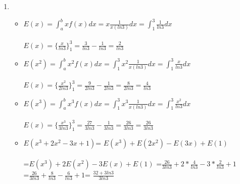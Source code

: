 \documentclass[a4paper,11pt]{article}
\begin{document}
\begin{enumerate}
\item \begin{itemize}
    \item $E(x) = \int_a^bxf(x)dx = x\frac{1}{x(ln3)} dx= \int_1^3\frac{1}{ln3}dx$\\\\
    $E(x) =\{\frac{x}{ln3}\}_1^3 = \frac{3}{ln3}-\frac{1}{ln3} = \frac{2} {ln3}$
    \vspace{0.7cm}
    \item $E(x^2) = \int_a^bx^2f(x)dx =\int_1^3 x^2\frac{1}{x(ln3)} dx= \int_1^3\frac{x}{ln3}dx$\\\\
      $E(x) =\{\frac{x^2}{2ln3}\}_1^3 = \frac{9}{2ln3}-\frac{1}{2ln3} = \frac{8} {2ln3} =\frac{4} {ln3} $
      \vspace{0.7cm}
    \item $E(x^3) = \int_a^bx^3f(x)dx =\int_1^3 x^3\frac{1}{x(ln3)} dx= \int_1^3\frac{x^2}{ln3}dx$\\\\
      $E(x) =\{\frac{x^3}{3ln3}\}_1^3 = \frac{27}{3ln3}-\frac{1}{3ln3} = \frac{26} {3ln3} =\frac{26}{3ln3}$
      \vspace{0.7cm}
      \item $E(x^3+2x^2-3x+1)$= $E(x^3)+E(2x^2)-E(3x)+E(1)$ \\\\
      =$E(x^3)+2E(x^2)-3E(x)+E(1)$ =$\frac{26}{3ln3}+2*\frac{4} {ln3}-3*\frac{2} {ln3}+1$\\
      =$\frac{26}{3ln3}+\frac{8} {ln3}-\frac{6} {ln3}+1$= $\frac{32+3ln3} {3ln3}$
      

\end{itemize}
\end{enumerate}
\end{document}
